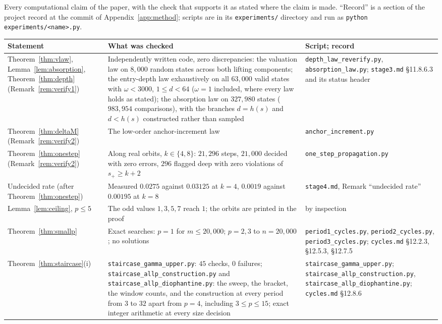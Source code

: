 \documentclass[11pt]{article}
\theoremstyle{remark}
\newcommand{\w}{\omega}
\begin{document}
Every computational claim of the paper, with the check that supports it as stated where the claim is made. ``Record'' is a section of the project record at the commit of Appendix~\ref{app:method}; scripts are in its \texttt{experiments/} directory and run as \texttt{python experiments/<name>.py}.

{\small
\begin{longtable}{>{\raggedright\arraybackslash}p{}>{\raggedright\arraybackslash}p{}>{\raggedright\arraybackslash}p{}}
\hline
Statement & What was checked & Script; record \\
\hline
\endhead
Theorem~\ref{thm:vlaw}, Lemma~\ref{lem:absorption}, Theorem~\ref{thm:depth} (Remark~\ref{rem:verify1}) & Independently written code, zero discrepancies: the valuation law on $8{,}000$ random states across both lifting components; the entry-depth law exhaustively on all $63{,}000$ valid states with $\w < 3000$, $1 \le d < 64$ ($\w = 1$ included, where every law holds as stated); the absorption law on $327{,}980$ states ($983{,}954$ comparisons), with the branches $d = h(s)$ and $d < h(s)$ constructed rather than sampled & \texttt{depth\_law\_reverify.py}, \texttt{absorption\_law.py}; \texttt{stage3.md} \S11.8.6.3 and its status header \\
Theorem~\ref{thm:deltaM} (Remark~\ref{rem:verify2}) & The low-order anchor-increment law & \texttt{anchor\_increment.py} \\
Theorem~\ref{thm:onestep} (Remark~\ref{rem:verify2}) & Along real orbits, $k \in \{4,8\}$: $21{,}296$ steps, $21{,}000$ decided with zero errors, $296$ flagged deep with zero violations of $s_+ \ge k+2$ & \texttt{one\_step\_propagation.py} \\
Undecided rate (after Theorem~\ref{thm:onestep}) & Measured $0.0275$ against $0.03125$ at $k = 4$, $0.0019$ against $0.00195$ at $k = 8$ & \texttt{stage4.md}, Remark ``undecided rate'' \\
Lemma~\ref{lem:ceiling}, $p \le 5$ & The odd values $1, 3, 5, 7$ reach $1$; the orbits are printed in the proof & by inspection \\
Theorem~\ref{thm:smallp} & Exact searches: $p = 1$ for $m \le 20{,}000$; $p = 2, 3$ to $n = 20{,}000$; no solutions & \texttt{period1\_cycles.py}, \texttt{period2\_cycles.py}, \texttt{period3\_cycles.py}; \texttt{cycles.md} \S12.2.3, \S12.5.3, \S12.7.5 \\
Theorem~\ref{thm:staircase}(i) & \texttt{staircase\_gamma\_upper.py}: $45$ checks, $0$ failures; \texttt{staircase\_allp\_\allowbreak construction.py} and \texttt{staircase\_allp\_\allowbreak diophantine.py}: the sweep, the bracket, the window counts, and the construction at every period from $3$ to $32$ apart from $p = 4$, including $3 \le p \le 15$; exact integer arithmetic at every size decision & \texttt{staircase\_gamma\_upper.py}; \texttt{staircase\_allp\_\allowbreak construction.py}, \texttt{staircase\_allp\_\allowbreak diophantine.py}; \texttt{cycles.md} \S12.8.6 \\

\end{longtable}}
\end{document}
